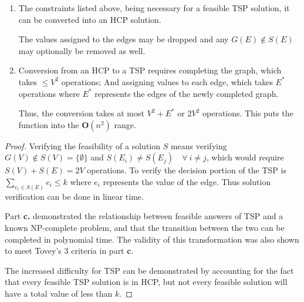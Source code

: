 \documentclass[12pt,letterpaper]{exam}
\begin{document}
\begin{questions}
\begin{parts}
\begin{solution}
\begin{subparts}
\begin{enumerate}
					\item
					The constraints listed above, being necessary for a feasible TSP solution,
					it can be converted into an HCP solution. 
					
					The values assigned to the edges may be dropped and any
					\(G(E) \notin S(E)\)
					may optionally be removed as well.
					
					\item
					Conversion from an HCP to a TSP requires completing the graph, 
					which takes \(\leq V^2\) operations;
					And assigning values to each edge, which takes \(E^*\) operations
					where \(E^*\) represents the edges of the newly completed graph.
					
					Thus, the conversion takes at most \(V^2 + E^*\) or \(2V^2\) operations.
					This puts the function into the \(\mathbf{O}(n^2)\) range.
					
				\end{enumerate}
				
				
				\subpart
				
				\begin{proof}
				Verifying the feasibility of a solution \(S\) means verifying
				\(G(V) \notin S(V) = \{\emptyset\} \) and 			
				\(S(E_i) \neq S(E_j) \quad \forall\ i\neq j\),
				which would require \(S(V) + S(E) = 2V\) operations.
				To verify the decision portion of the TSP is
				\(\sum_{e_i\in S(E)}e_i \leq k\) 
				where \(e_i\) represents the value of the edge.
				Thus solution verification can be done in linear time.
				
				Part \textbf{c.} demonstrated the relationship between feasible answers
				of TSP and a known NP-complete problem, and that the transition between
				the two can be completed in polynomial time. 
				The validity of this transformation was also shown to meet Tovey's 3 criteria in part \textbf{c}.
				
				The increased difficulty for TSP can be demonstrated by accounting for the fact that
				every feasible TSP solution is in HCP, but not every feasible solution
				will have a total value of less than \(k\).
				\end{proof}				
				
				
			\end{subparts}
			
			
		\end{solution}
		
		

\end{parts}
\end{questions}
\end{document}

